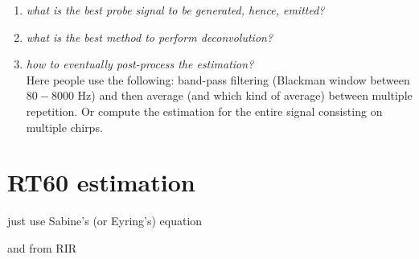 \begin{enumerate}
    \item \textit{what is the best probe signal to be generated, hence, emitted?}
    \item \textit{what is the best method to perform deconvolution?}
    \item \textit{how to eventually post-process the estimation?}
    \\Here people use the following:
    band-pass filtering (Blackman window between $80-8000$ Hz) and then
    average (and which kind of average) between multiple repetition.
    Or compute the estimation for the entire signal consisting on
    multiple chirps.
\end{enumerate}


\section{RT60 estimation}\label{sec:rir:rt60}

 just use Sabine's (or Eyring's) equation

 and from RIR


